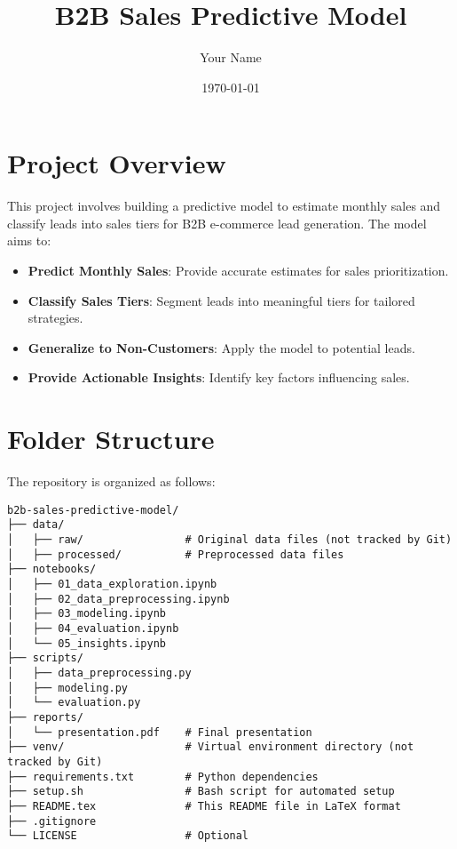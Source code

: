 \documentclass{article}
\title{B2B Sales Predictive Model}
\author{Your Name}
\date{\today}
\begin{document}
\maketitle

\tableofcontents

\section{Project Overview}

This project involves building a predictive model to estimate monthly sales and classify leads into sales tiers for B2B e-commerce lead generation. The model aims to:

\begin{itemize}
    \item \textbf{Predict Monthly Sales}: Provide accurate estimates for sales prioritization.
    \item \textbf{Classify Sales Tiers}: Segment leads into meaningful tiers for tailored strategies.
    \item \textbf{Generalize to Non-Customers}: Apply the model to potential leads.
    \item \textbf{Provide Actionable Insights}: Identify key factors influencing sales.
\end{itemize}

\section{Folder Structure}

The repository is organized as follows:

\begin{verbatim}
b2b-sales-predictive-model/
├── data/
│   ├── raw/                # Original data files (not tracked by Git)
│   ├── processed/          # Preprocessed data files
├── notebooks/
│   ├── 01_data_exploration.ipynb
│   ├── 02_data_preprocessing.ipynb
│   ├── 03_modeling.ipynb
│   ├── 04_evaluation.ipynb
│   └── 05_insights.ipynb
├── scripts/
│   ├── data_preprocessing.py
│   ├── modeling.py
│   └── evaluation.py
├── reports/
│   └── presentation.pdf    # Final presentation
├── venv/                   # Virtual environment directory (not tracked by Git)
├── requirements.txt        # Python dependencies
├── setup.sh                # Bash script for automated setup
├── README.tex              # This README file in LaTeX format
├── .gitignore
└── LICENSE                 # Optional
\end{verbatim}
\end{document}
